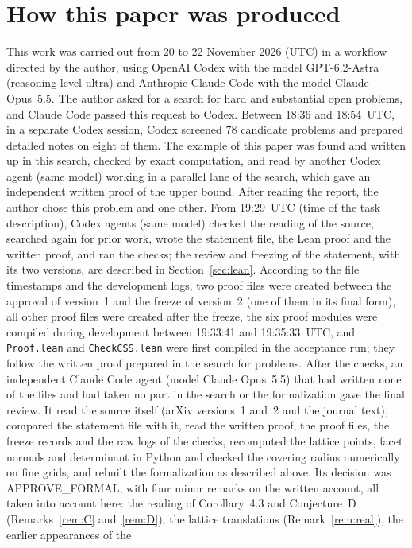 \documentclass[11pt]{article}
\theoremstyle{definition}
\theoremstyle{remark}
\begin{document}
\section*{How this paper was produced}
This work was carried out from 20 to 22 November 2026 (UTC) in a workflow directed by
the author, using OpenAI Codex with the model GPT-6.2-Astra (reasoning level
ultra) and Anthropic Claude Code with the model Claude Opus~5.5. The author
asked for a search for hard and substantial open problems, and Claude Code
passed this request to Codex. Between 18:36 and 18:54~UTC, in a separate Codex
session, Codex screened $78$ candidate problems and prepared detailed notes on
eight of them. The example of this paper was found and written up in this
search, checked by exact computation, and read by another Codex agent (same
model) working in a parallel lane of the search, which gave an independent
written proof of the upper bound. After reading the report, the author chose
this problem and one other. From 19:29~UTC (time of the task description),
Codex agents (same model) checked the reading of the source, searched again for
prior work, wrote the statement file, the Lean proof and the written proof,
and ran the checks; the review and freezing of the statement, with its two
versions, are described in Section~\ref{sec:lean}. According to the file
timestamps and the development logs, two proof files were created between the
approval of version~1 and the freeze of version~2 (one of them in its final
form), all other proof files were
created after the freeze, the six proof modules were compiled during
development between 19:33:41 and 19:35:33~UTC, and \texttt{Proof.lean} and
\texttt{CheckCSS.lean} were first compiled in the acceptance run; they follow the written proof prepared in the search for
problems. After the checks, an independent Claude Code agent (model Claude
Opus~5.5) that had written none of the files and had taken no part in the
search or the formalization gave the final review. It read the source itself
(arXiv versions~1 and~2 and the journal text), compared the statement file
with it, read the written proof, the proof files, the freeze records and the
raw logs of the checks, recomputed the lattice points, facet normals
and determinant in Python and checked the covering radius numerically on
fine grids, and rebuilt the formalization as
described above. Its decision was APPROVE\_FORMAL, with four minor remarks on
the written account, all taken into account here: the reading of
Corollary~4.3 and Conjecture~D (Remarks~\ref{rem:C} and~\ref{rem:D}), the
lattice translations (Remark~\ref{rem:real}), the earlier appearances of the
\end{document}
